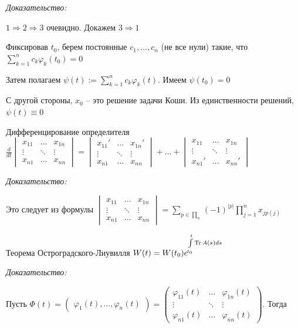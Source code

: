 \documentclass[12pt]{article}
\begin{document}
\textit{Доказательство:}

$1 \Rightarrow 2 \Rightarrow 3$ очевидно. Докажем $3 \Rightarrow 1$

Фиксировав $t_0$, берем постоянные $c_1, \ldots, c_n$ (не все нули) такие, что $\sum\limits_{k = 1}^n c_k \varphi_k(t_0) = 0$

Затем полагаем $\psi(t) := \sum\limits_{k = 1}^n c_k \varphi_k(t)$. Имеем $\psi(t_0) = 0$

С другой стороны, $x_0$ -- это решение задачи Коши. Из единственности решений, $\psi(t) \equiv 0$

\begin{lem}{Дифференцирование определителя}
    $\frac{d}{dt}\begin{vmatrix}
        x_{11} & \ldots & x_{1n} \\
        \vdots & \ddots & \vdots \\
        x_{n1} & \ldots & x_{nn}
    \end{vmatrix} = \begin{vmatrix}
        x_{11}' & \ldots & x_{1n}' \\
        \vdots & \ddots & \vdots \\
        x_{n1} & \ldots & x_{nn}
    \end{vmatrix} + \ldots + \begin{vmatrix}
        x_{11} & \ldots & x_{1n} \\
        \vdots & \ddots & \vdots \\
        x_{n1}' & \ldots & x_{nn}'
    \end{vmatrix}$
\end{lem}

\textit{Доказательство:}

Это следует из формулы $\begin{vmatrix}
    x_{11} & \ldots & x_{1n} \\
    \vdots & \ddots & \vdots \\
    x_{n1} & \ldots & x_{nn}
\end{vmatrix} = \sum\limits_{p \in \prod_n} (-1)^{|p|} \prod\limits_{j = 1}^n x_{j p(j)}$

\begin{theo}{Теорема Остроградского-Лиувилля}
    $W(t) = W(t_0)e^{\int\limits_{t_0}^t \operatorname{Tr} A(s) ds}$
\end{theo}

\textit{Доказательство:}

Пусть $\Phi(t) = \begin{pmatrix}
    \varphi_1(t), \ldots, \varphi_n(t)
\end{pmatrix} = \begin{pmatrix}
    \varphi_{11}(t) & \ldots & \varphi_{1n}(t) \\
    \vdots & \ddots & \vdots \\
    \varphi_{n1}(t) & \ldots & \varphi_{nn}(t)
\end{pmatrix}$. Тогда 
\end{document}
